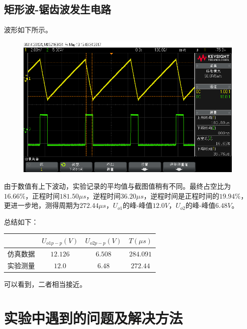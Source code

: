 \documentclass[12pt,a4paper]{article}
\begin{document}
\begin{spacing}{1.3}
\subsection{矩形波-锯齿波发生电路}
波形如下所示。
\begin{figure}[H]
\centering
\includegraphics[width=\textwidth]{scope_9.png}
\end{figure}
由于数值有上下波动，实验记录的平均值与截图值稍有不同。最终占空比为$16.66\%$，正程时间$181.50\mu s$，逆程时间$36.20\mu s$，逆程时间是正程时间的$19.94\%$，更进一步地，测得周期为$272.44\mu s$，$U_{o1}$的峰-峰值$12.0V$，$U_{o2}$的峰-峰值$6.48V$。\par
总结如下：
\begin{table} [H]
\centering
\begin{tabular}{|c|c|c|c|}
\hline 
&$U_{o1p-p}(V)$ &$U_{o2p-p}(V)$ &$ T(\mu s)$\\ \hline 
仿真数据&$12.126$&$6.508$&$284.091$\\ \hline
实验测量&$12.0$&$6.48$&$272.44$\\ \hline
\end{tabular}
\end{table}
可以看到，二者相当接近。
\section{实验中遇到的问题及解决方法}

\end{spacing}
\end{document}
